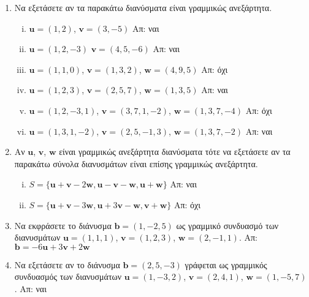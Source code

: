 \begin{enumerate}

  \item\label{ask:lineks} Να εξετάσετε αν τα παρακάτω διανύσματα είναι γραμμικώς 
    ανεξάρτητα.
    \begin{enumerate}[(i)]
      \item $ \mathbf{u} = (1,2) $, $ \mathbf{v} = (3,-5) $ \hfill Απ: ναι
      \item $ \mathbf{u} = (1,2,-3) $ $ \mathbf{v} = (4,5,-6) $ \hfill Απ: ναι
      \item $ \mathbf{u} = (1,1,0)$, $ \mathbf{v} = (1,3,2)$, $ \mathbf{w} = (4,9,5) $ 
        \hfill Απ: όχι 
      \item $ \mathbf{u} = (1,2,3)$, $ \mathbf{v} = (2,5,7)$, $ \mathbf{w} = (1,3,5) $ 
        \hfill Απ: ναι 
      \item $ \mathbf{u} = (1,2,-3,1) $, $ \mathbf{v} = (3,7,1,-2) $, $ \mathbf{w} =
        (1,3,7,-4) $ \hfill Απ: όχι
      \item $ \mathbf{u} = (1,3,1,-2) $, $ \mathbf{v} = (2,5,-1,3) $, $ \mathbf{w} =
        (1,3,7,-2) $ \hfill Απ: ναι
    \end{enumerate}

  \item Αν $ \mathbf{u} $, $ \mathbf{v} $, $ \mathbf{w} $ είναι γραμμικώς 
    ανεξάρτητα διανύσματα τότε να εξετάσετε αν τα παρακάτω σύνολα διανυσμάτων 
    είναι επίσης γραμμικώς ανεξάρτητα.
    \begin{enumerate}[(i)]
      \item $ S = \{ \mathbf{u} + \mathbf{v} - 2 \mathbf{w}, \mathbf{u} - \mathbf{v} -
        \mathbf{w}, \mathbf{u} + \mathbf{w} \} $ \hfill Απ: ναι 
      \item $ S = \{ \mathbf{u} + \mathbf{v} - 3 \mathbf{w}, \mathbf{u} + 3 \mathbf{v} -
        \mathbf{w}, \mathbf{v} + \mathbf{w}\}  $ \hfill Απ: όχι 
    \end{enumerate}

  \item\label{ask:eksart} Να εκφράσετε το διάνυσμα $ \mathbf{b} = (1,-2,5) $ ως γραμμικό 
    συνδυασμό των διανυσμάτων $ \mathbf{u} = (1,1,1)$, $ \mathbf{v} = (1,2,3)$, 
    $ \mathbf{w} = (2,-1,1) $.
    \hfill Απ: $ \mathbf{b} = -6 \mathbf{u} + 3 \mathbf{v} +2 \mathbf{w} $ 	

  \item\label{ask:eksart2} Να εξετάσετε αν το διάνυσμα $ \mathbf{b} = (2,5,-3) $ 
    γράφεται ως γραμμικός συνδυασμός των διανυσμάτων $ \mathbf{u} = (1,-3,2)$, 
    $ \mathbf{v} = (2,4,1)$, $ \mathbf{w} = (1,-5,7) $.
    \hfill Απ: ναι 


\end{enumerate}
